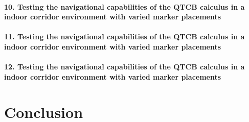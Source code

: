 \paragraph{10. Testing the navigational capabilities of the QTCB calculus in a indoor corridor environment with varied marker placements}
\paragraph{11. Testing the navigational capabilities of the QTCB calculus in a indoor corridor environment with varied marker placements}
\paragraph{12. Testing the navigational capabilities of the QTCB calculus in a indoor corridor environment with varied marker placements}
\section{Conclusion}

